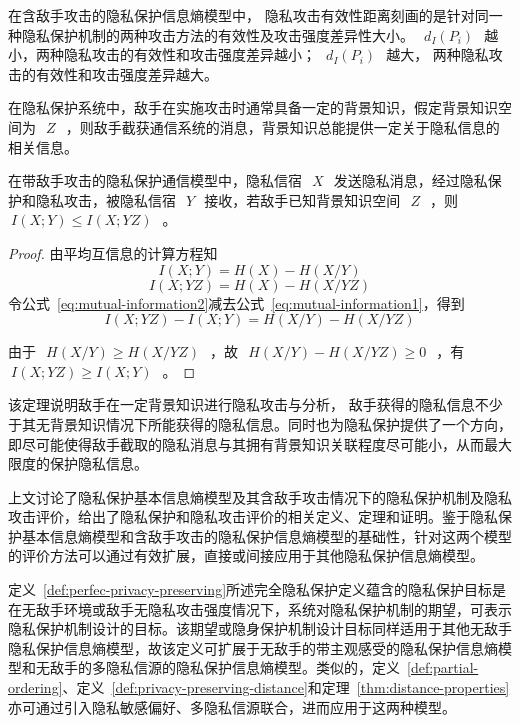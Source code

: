 在含敌手攻击的隐私保护信息熵模型中， 隐私攻击有效性距离刻画的是针对同一种隐私保护机制的两种攻击方法的有效性及攻击强度差异性大小。~$~d_{I}(P_{i})~$~越小，两种隐私攻击的有效性和攻击强度差异越小；~$~d_{I}(P_{i})~$~越大， 两种隐私攻击的有效性和攻击强度差异越大。

在隐私保护系统中，敌手在实施攻击时通常具备一定的背景知识，假定背景知识空间为~$~Z~$~，则敌手截获通信系统的消息，背景知识总能提供一定关于隐私信息的相关信息。

\begin{theorem}
	\label{thm:privacy-attack-performance}
	在带敌手攻击的隐私保护通信模型中，隐私信宿~$~X~$~发送隐私消息，经过隐私保护和隐私攻击，被隐私信宿~$~Y~$~接收，若敌手已知背景知识空间~$~Z~$~，则~$~I(X;Y)\leqslant I(X;YZ)~$~。
\end{theorem} 

\begin{proof}
由平均互信息的计算方程知
\begin{equation}
\label{eq:mutual-information1}
I(X;Y) =H(X)-H(X/Y)
\end{equation}
\begin{equation}
\label{eq:mutual-information2}
I(X;YZ) =H(X)-H(X/YZ)
\end{equation}
令公式~\ref{eq:mutual-information2}减去公式~\ref{eq:mutual-information1}，得到
\begin{equation}
I(X;YZ)-I(X;Y) =H(X/Y)-H(X/YZ)
\end{equation}

由于~$~H(X/Y) \geqslant H(X/YZ)~$~，故~$~H(X/Y)- H(X/YZ)\geqslant0~$~，有~$~I(X;YZ)\geqslant I(X;Y)~$~。
\end{proof}

该定理说明敌手在一定背景知识进行隐私攻击与分析， 敌手获得的隐私信息不少于其无背景知识情况下所能获得的隐私信息。同时也为隐私保护提供了一个方向，即尽可能使得敌手截取的隐私消息与其拥有背景知识关联程度尽可能小，从而最大限度的保护隐私信息。


上文讨论了隐私保护基本信息熵模型及其含敌手攻击情况下的隐私保护机制及隐私攻击评价，给出了隐私保护和隐私攻击评价的相关定义、定理和证明。鉴于隐私保护基本信息熵模型和含敌手攻击的隐私保护信息熵模型的基础性，针对这两个模型的评价方法可以通过有效扩展，直接或间接应用于其他隐私保护信息熵模型。

定义~\ref{def:perfec-privacy-preserving}所述完全隐私保护定义蕴含的隐私保护目标是在无敌手环境或敌手无隐私攻击强度情况下，系统对隐私保护机制的期望，可表示隐私保护机制设计的目标。该期望或隐身保护机制设计目标同样适用于其他无敌手隐私保护信息熵模型，故该定义可扩展于无敌手的带主观感受的隐私保护信息熵模型和无敌手的多隐私信源的隐私保护信息熵模型。类似的，定义~\ref{def:partial-ordering}、定义~\ref{def:privacy-preserving-distance}和定理~\ref{thm:distance-properties}亦可通过引入隐私敏感偏好、多隐私信源联合，进而应用于这两种模型。

